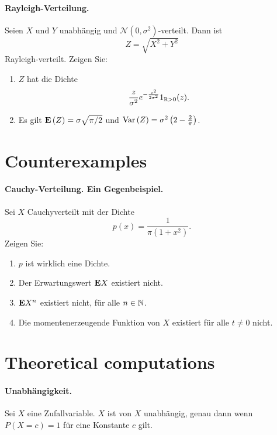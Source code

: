 \paragraph{Rayleigh-Verteilung. }  Seien $X$ und $Y$ unabhängig und 
$\mathcal N (0, \sigma^2)$-verteilt. Dann ist
\begin{equation*}
    Z= \sqrt{X^2 + Y^2} 
\end{equation*}
Rayleigh-verteilt. Zeigen Sie:
\begin{enumerate}
    \item $Z$ hat die Dichte
        \begin{equation*}
            \frac{z}{\sigma^2}e^{-\frac{z^2}{2\sigma^2}}1_{\mathbb R>0}(z).
        \end{equation*}
    \item Es gilt $\mathbf{E}\left( Z \right) = \sigma \sqrt{\pi/2}$ und $\operatorname{Var}\left( Z
        \right) = \sigma^2 \left( 2 - \frac{2}{\pi} \right)$.
\end{enumerate}


\section{Counterexamples}

\paragraph{Cauchy-Verteilung. Ein Gegenbeispiel.}
Sei $X$ Cauchyverteilt mit der Dichte
\begin{equation*}
    p(x) = \frac{1}{\pi (1+x^2)}.
\end{equation*}
Zeigen Sie:
\begin{enumerate}
    \item $p$ ist wirklich eine Dichte.
    \item Der Erwartungswert $\mathbf{E} X$ existiert nicht.
    \item $\mathbf{E} X^n$ existiert nicht, für alle $n\in \mathbb N$. 
    \item Die momentenerzeugende Funktion von $X$ existiert für alle $t \neq 0$ nicht. 
\end{enumerate}



\section{Theoretical computations}

\paragraph{Unabhängigkeit.} 
Sei $X$ eine Zufallvariable. $X$ ist von $X$ unabhängig, genau dann wenn
$P(X = c)=1$ für eine Konstante $c$ gilt. %

